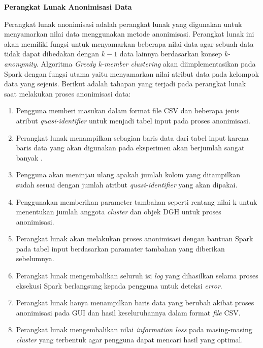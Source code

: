 \documentclass[a4paper,twoside]{article}
\begin{document}
\begin{enumerate}
\textbf{Perangkat Lunak Anonimisasi Data}

Perangkat lunak anonimisasi adalah perangkat lunak yang digunakan untuk menyamarkan nilai data menggunakan metode anonimisasi. Perangkat lunak ini akan memiliki fungsi untuk menyamarkan beberapa nilai data agar sebuah data tidak dapat dibedakan dengan $k-1$ data lainnya berdasarkan konsep \textit{k-anonymity}. Algoritma \textit{Greedy k-member clustering} akan diimplementasikan pada Spark dengan fungsi utama yaitu menyamarkan nilai atribut data pada kelompok data yang sejenis. Berikut adalah tahapan yang terjadi pada perangkat lunak saat melakukan proses anonimisasi data:

\begin{enumerate}

\item Pengguna memberi masukan dalam format file CSV dan beberapa jenis atribut \textit{quasi-identifier} untuk menjadi tabel input pada proses anonimisasi.

\item Perangkat lunak menampilkan sebagian baris data dari tabel input karena baris data yang akan digunakan pada eksperimen akan berjumlah sangat banyak .

\item Pengguna akan meninjau ulang apakah jumlah kolom yang ditampilkan sudah sesuai dengan jumlah atribut \textit{quasi-identifier} yang akan dipakai.

\item Penggunakan memberikan parameter tambahan seperti rentang nilai k untuk menentukan jumlah anggota \textit{cluster} dan objek DGH untuk proses anonimisasi.

\item Perangkat lunak akan melakukan proses anonimisasi dengan bantuan Spark pada tabel input berdasarkan paramater tambahan yang diberikan sebelumnya. 

\item Perangkat lunak mengembalikan seluruh isi \textit{log} yang dihasilkan selama proses eksekusi Spark berlangsung kepada pengguna untuk deteksi \textit{error}.

\item Perangkat lunak hanya menampilkan baris data yang berubah akibat proses anonimisasi pada GUI dan hasil keseluruhannya dalam format \textit{file} CSV.

\item Perangkat lunak mengembalikan nilai \textit{information loss} pada masing-masing \textit{cluster} yang terbentuk agar pengguna dapat mencari hasil yang optimal.


\end{enumerate}
\end{enumerate}
\end{document}
